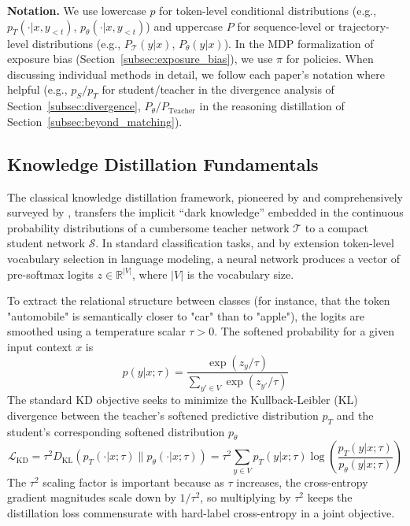 \documentclass{article} %
\newcommand{\KL}{D_{\mathrm{KL}}}
\newcommand{\ptheta}{p_\theta}
\newcommand{\pteacher}{p_T}
\newcommand{\loss}{\mathcal{L}}
\begin{document}
\textbf{Notation.} We use lowercase $p$ for token-level conditional distributions (e.g., $\pteacher(\cdot|x, y_{<t})$, $\ptheta(\cdot|x, y_{<t})$) and uppercase $P$ for sequence-level or trajectory-level distributions (e.g., $P_{\mathcal{T}}(y|x)$, $P_\theta(y|x)$). In the MDP formalization of exposure bias (Section~\ref{subsec:exposure_bias}), we use $\pi$ for policies. When discussing individual methods in detail, we follow each paper's notation where helpful (e.g., $p_S/p_T$ for student/teacher in the divergence analysis of Section~\ref{subsec:divergence}, $P_\theta/P_{\text{Teacher}}$ in the reasoning distillation of Section~\ref{subsec:beyond_matching}).

\subsection{Knowledge Distillation Fundamentals}
\label{subsec:kd_fundamentals}

The classical knowledge distillation framework, pioneered by \citet{hinton2015distilling} and comprehensively surveyed by \citet{2006.05525}, transfers the implicit ``dark knowledge'' embedded in the continuous probability distributions of a cumbersome teacher network $\mathcal{T}$ to a compact student network $\mathcal{S}$. In standard classification tasks, and by extension token-level vocabulary selection in language modeling, a neural network produces a vector of pre-softmax logits $z \in \mathbb{R}^{|V|}$, where $|V|$ is the vocabulary size.

To extract the relational structure between classes (for instance, that the token "automobile" is semantically closer to "car" than to "apple"), the logits are smoothed using a temperature scalar $\tau > 0$. The softened probability for a given input context $x$ is
\begin{equation}
    p(y|x; \tau) = \frac{\exp(z_y / \tau)}{\sum_{y' \in V} \exp(z_{y'} / \tau)}
\end{equation}
The standard KD objective seeks to minimize the Kullback-Leibler (KL) divergence between the teacher's softened predictive distribution $\pteacher$ and the student's corresponding softened distribution $\ptheta$
\begin{equation}
    \loss_{\mathrm{KD}} = \tau^2 \KL(\pteacher(\cdot|x; \tau) \parallel \ptheta(\cdot|x; \tau)) = \tau^2 \sum_{y \in V} \pteacher(y|x; \tau) \log \left( \frac{\pteacher(y|x; \tau)}{\ptheta(y|x; \tau)} \right)
\end{equation}
The $\tau^2$ scaling factor is important because as $\tau$ increases, the cross-entropy gradient magnitudes scale down by $1/\tau^2$, so multiplying by $\tau^2$ keeps the distillation loss commensurate with hard-label cross-entropy in a joint objective.
\end{document}

